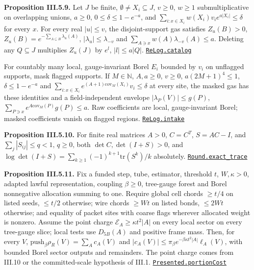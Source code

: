 \documentclass[
  letterpaper,
  11pt]{article}
\begin{document}
\textbf{Proposition III.5.9.} Let \(J\) be finite,
\(\emptyset\ne X_i\subseteq J\), \(v\ge0\), \(w\ge1\) submultiplicative
on overlapping unions, \(a\ge0\), \(0\le\delta\le1-e^{-a}\), and
\(\sum_{i:x\in X_i}w(X_i)v_ie^{a|X_i|}\le\delta\) for every \(x\). For
every real \(|u|\le v\), the disjoint-support gas satisfies
\(Z_u(B)>0\), \(Z_u(B)=e^{-\sum_{A\subseteq B}\lambda_u(A)}\),
\(|\lambda_u|\le\lambda_{-v}\) and
\(\sum_{A\ni x}w(A)\lambda_{-v}(A)\le a\). Deleting any \(Q\subseteq J\)
multiplies \(Z_u(J)\) by \(e^l\), \(|l|\le a|Q|\).
\href{https://github.com/yang-mills-group/OpenAI-YM-20261028/blob/3456e5e75cf8d4cd558955a5c7638fba2d68f464/YM/SectorNext/VACUUM_NORMALIZATION/Gas.lean\#L217-L228}{\texttt{ReLog.catalog}}

For countably many local, gauge-invariant Borel \(E_i\) bounded by
\(v_i\) on unflagged supports, mask flagged supports. If
\(M\in\mathbb N\), \(A,a\ge0\), \(v\ge0\), \(a(2M+1)^4\le1\),
\(\delta\le1-e^{-a}\) and
\(\sum_{i:x\in X_i}e^{(A+1)\mathrm{cov}_M(X_i)}v_i\le\delta\) at every
site, the masked gas has these identities and a field-independent
envelope \(|\lambda_P(V)|\le g(P)\),
\(\sum_{P\ni x}e^{A\mathrm{cov}_M(P)}g(P)\le a\). Raw coefficients are
local, gauge-invariant Borel; masked coefficients vanish on flagged
regions.
\href{https://github.com/yang-mills-group/OpenAI-YM-20261028/blob/3456e5e75cf8d4cd558955a5c7638fba2d68f464/YM/SectorNext/VACUUM_NORMALIZATION/Bulk.lean\#L157-L183}{\texttt{ReLog.intake}}

\textbf{Proposition III.5.10.} For finite real matrices \(A>0\),
\(C=C^T\), \(S=AC-I\), and \(\sum_j|S_{ij}|\le q<1\), \(q\ge0\), both
\(\det C,\det(I+S)>0\), and
\(\log\det(I+S)=\sum_{k\ge1}(-1)^{k+1}\mathrm{tr}(S^k)/k\) absolutely.
\href{https://github.com/yang-mills-group/OpenAI-YM-20261028/blob/3456e5e75cf8d4cd558955a5c7638fba2d68f464/YM/SectorNext/VACUUM_NORMALIZATION/Round.lean\#L149-L155}{\texttt{Round.exact\_trace}}

\textbf{Proposition III.5.11.} Fix a funded step, tube, estimator,
threshold \(t\), \(W,\kappa>0\), adapted lawful representation, coupling
\(\beta\ge0\), tree-gauge forest and Borel nonnegative allocation
summing to one. Require global cell chords \(\ge t/4\) on listed seeds,
\(\le t/2\) otherwise; wire chords \(\ge Wt\) on listed bonds,
\(\le2Wt\) otherwise; and equality of packet sites with coarse flags
wherever allocated weight is nonzero. Assume the point charge
\(\mathcal E_A\ge\kappa t^2|A|\) on every local sector on every
tree-gauge slice; local tests use \(D_{5B}(A)\) and positive frame mass.
Then, for every \(V\), \(\mathrm{push}_\beta\rho_R(V)=\sum_Ac_A(V)\) and
\(|c_A(V)|\le\pi_\beta e^{-\beta\kappa t^2|A|}\ell_A(V)\), with bounded
Borel sector outputs and remainders. The point charge comes from III.10
or the committed-scale hypothesis of III.1.
\href{https://github.com/yang-mills-group/OpenAI-YM-20261028/blob/3456e5e75cf8d4cd558955a5c7638fba2d68f464/YM/Push/SECTOR_MEASURE/Presented.lean\#L157-L210}{\texttt{Presented.portionCost}}
\end{document}
